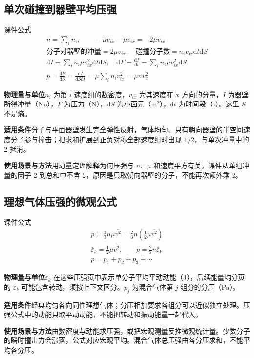 \documentclass[UTF8,fontset=none,zihao=-4,a4paper]{ctexart}
\newcommand{\explain}[3]{\par\noindent\textbf{物理量与单位}\quad #1\par
\noindent\textbf{适用条件}\quad #2\par
\noindent\textbf{使用场景与方法}\quad #3\par}
\begin{document}
\par\noindent\begin{minipage}{\linewidth}
\subsection{单次碰撞到器壁平均压强}
\begin{infobox}[breakable=false]{课件公式}
\begin{gather*}n=\sum_i n_i,\qquad-\mu v_{ix}-\mu v_{ix}=-2\mu v_{ix}\\\text{分子对器壁的冲量}=2\mu v_{ix},\quad\text{碰撞分子数}=n_iv_{ix}\mathrm dt\mathrm dS\\\mathrm dI=\sum_i n_i\mu v_{ix}^2\mathrm dt\mathrm dS,\quad\mathrm dF=\frac{\mathrm dI}{\mathrm dt}=\sum_i n_i\mu v_{ix}^2\mathrm dS\\p=\frac{\mathrm dF}{\mathrm dS}=\frac{\mathrm dI}{\mathrm dS\mathrm dt}=\mu\sum_i n_iv_{ix}^2=\mu n\overline{v_x^2}\end{gather*}
\end{infobox}
\end{minipage}\par
\explain{$n_i$ 为第 $i$ 速度组的数密度，$v_{ix}$ 为其速度在 $x$ 方向的分量，$I$ 为器壁所得冲量（$\mathrm{N\,s}$），$F$ 为压力（N），$\mathrm dS$ 为小面元（$\mathrm m^2$），$\mathrm dt$ 为时间段（s）。这里 $S$ 不是熵。}{分子与平面器壁发生完全弹性反射，气体均匀。只有朝向器壁的半空间速度分子参与撞击；把求和扩展到正负对称全部速度组时出现 $1/2$，与单次冲量中的 2 抵消。}{用动量定理解释为何压强与 $n$、$\mu$ 和速度平方有关。课件从单组冲量的因子 2 到总和中不含 2，原因是只取朝向器壁的分子，不能再次额外乘 2。}


\par\noindent\begin{minipage}{\linewidth}
\subsection{理想气体压强的微观公式}
\begin{infobox}[breakable=false]{课件公式}
\begin{gather*}p=\frac13n\mu\overline{v^2}=\frac23n\left(\frac12\mu\overline{v^2}\right)\\\bar\varepsilon_k=\frac12\mu\overline{v^2},\qquad p=\frac23n\bar\varepsilon_k\\p=p_1+p_2+p_3+\cdots\end{gather*}
\end{infobox}
\end{minipage}\par
\explain{$\bar\varepsilon_k$ 在这些压强页中表示单分子平均平动动能（J），后续能量均分页的 $\bar\varepsilon_k$ 可能包含转动，须按上下文区分。$p_j$ 为混合气体第 $j$ 组分的分压（Pa）。}{经典均匀各向同性理想气体；分压相加要求各组分可以近似独立处理。压强公式中的动能只取平动动能，不能把转动和振动能量一起代入。}{由数密度与动能求压强，或把宏观测量反推微观统计量。少数分子的瞬时撞击力会涨落，公式对应宏观平均。混合气体总压强由各分压求和，不能平均各分压。}
\end{document}
